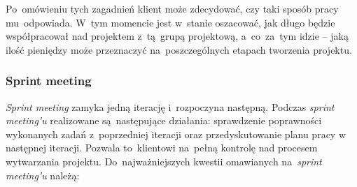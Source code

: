 Po~omówieniu tych zagadnień klient może zdecydować, czy taki sposób pracy mu~odpowiada. W~tym momencie jest w~stanie oszacować, jak długo będzie współpracował nad projektem z~tą~grupą projektową, a~co~za~tym idzie -- jaką ilość pieniędzy może przeznaczyć na~poszczególnych etapach tworzenia projektu.

\subsubsection{Sprint meeting} \label{scrum.sprintmeeting}

\textit{Sprint meeting} zamyka jedną iterację i~rozpoczyna następną. Podczas \textit{sprint meeting'u} realizowane są~następujące działania: sprawdzenie poprawności wykonanych zadań z~poprzedniej iteracji oraz przedyskutowanie planu pracy w następnej iteracji. Pozwala to~klientowi na~pełną kontrolę nad procesem wytwarzania projektu. Do~najważniejszych kwestii omawianych na~\textit{sprint meeting'u} należą:

